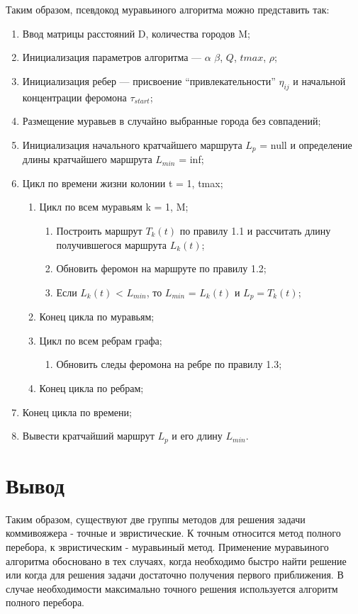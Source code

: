 \documentclass[a4paper,12pt]{report}
\begin{document}
Таким образом, псевдокод муравьиного алгоритма можно представить так:
\begin{enumerate}
\item Ввод матрицы расстояний D, количества городов M;
\item Инициализация параметров алгоритма — $\alpha$ $\beta$, $Q$, $tmax$, $\rho$;
\item Инициализация ребер — присвоение “привлекательности” $\eta_{ij}$ и начальной концентрации феромона  $\tau_{start}$;
\item	Размещение муравьев в случайно выбранные города без совпадений;
\item	Инициализация начального кратчайшего маршрута $L_{p}$ = null и определение длины кратчайшего маршрута $L_{min}$ = inf;
\item	Цикл по времени жизни колонии t = 1, tmax;
\begin{enumerate}
\item	Цикл по всем муравьям k = 1, M;
\begin{enumerate}
\item	Построить маршрут $T_{k}(t)$ по правилу 1.1  и рассчитать длину получившегося маршрута $L_{k}(t)$;
\item	Обновить феромон на маршруте по правилу 1.2;
\item	Если $L_{k}(t)$ < $L_{min}$, то $L_{min}$ = $L_{k}(t)$ и $L_{p} = T_{k}(t)$;
\end{enumerate}
\item	Конец цикла по муравьям;
\item Цикл по всем ребрам графа;
\begin{enumerate}
\item Обновить следы феромона на ребре по правилу 1.3;
\end{enumerate}
\item Конец цикла по ребрам;
\end{enumerate}
\item Конец цикла по времени;
\item Вывести кратчайший маршрут $L_{p}$ и его длину $L_{min}$.
\end{enumerate}

\section{Вывод}
\hspace{0.6cm}Таким образом, существуют две группы методов для решения задачи коммивояжера - точные и эвристические. К точным относится метод полного перебора, к эвристическим - муравьиный метод. Применение муравьиного алгоритма обосновано в тех случаях, когда необходимо быстро найти решение или когда для решения задачи достаточно получения первого приближения. В случае необходимости максимально точного решения используется алгоритм полного перебора.
\end{document}
